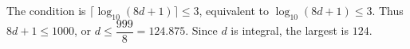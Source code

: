 The condition is $\lceil\log_{10}(8d+1)\rceil\le3$, equivalent to $\log_{10}(8d+1)\le3$. Thus $8d+1\le1000$, or $d\le\dfrac{999}{8}=124.875$. Since $d$ is integral, the largest is $\boxed{124}$.
